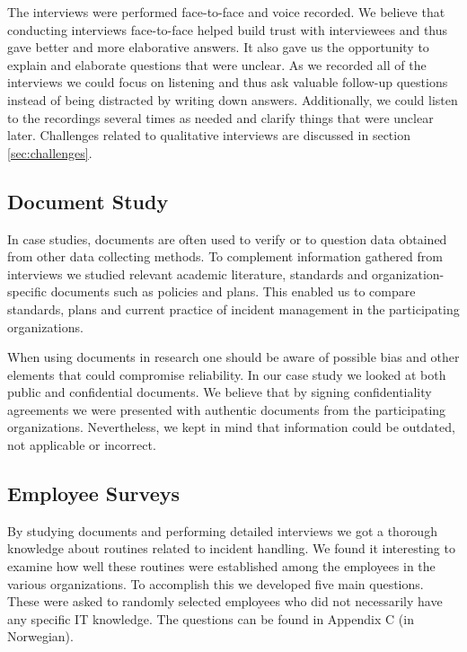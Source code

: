 The interviews were performed face-to-face and voice recorded. We believe that conducting interviews face-to-face helped build trust with interviewees and thus gave better and more elaborative answers. It also gave us the opportunity to explain and elaborate questions that were unclear. As we recorded all of the interviews we could focus on listening and thus ask valuable follow-up questions instead of being distracted by writing down answers. Additionally, we could listen to the recordings several times as needed and clarify things that were unclear later. Challenges related to qualitative interviews are discussed in section \ref{sec:challenges}.

\subsection{Document Study}
\label{sec:documentStudy}
In case studies, documents are often used to verify or to question data obtained from other data collecting methods. To complement information gathered from interviews we studied relevant academic literature, standards and organization-specific documents such as policies and plans. This enabled us to compare standards, plans and current practice of incident management in the participating organizations.

When using documents in research one should be aware of possible bias and other elements that could compromise reliability\cite{oates2005researching}. In our case study we looked at both public and confidential documents.  We believe that by signing confidentiality agreements we were presented with authentic documents from the participating organizations. Nevertheless, we kept in mind that information could be outdated, not applicable or incorrect.   

\subsection{Employee Surveys}
\label{sec:employeeSurveys}
By studying documents and performing detailed interviews we got a thorough knowledge about routines related to incident handling. We found it interesting to examine how well these routines were established among the employees in the various organizations. To accomplish this we developed five main questions. These were asked to randomly selected employees who did not necessarily have any specific IT knowledge. The questions can be found in Appendix C (in Norwegian).
 

